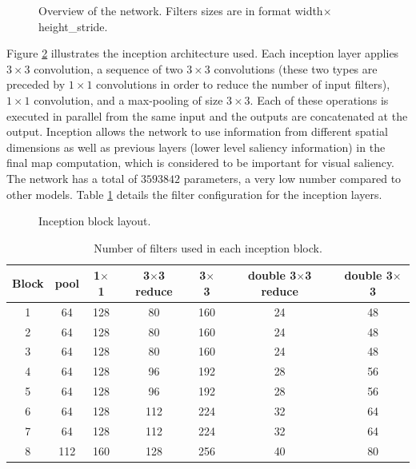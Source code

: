 \documentclass[10pt,twocolumn,letterpaper]{article}
\begin{document}
\begin{figure}
\begin{center}
\def\svgwidth{1.5\columnwidth}

\label{fig:model}
    \caption{Overview of the network.
        Filters sizes are in format width$\times$height\_stride.}
\end{center}
\end{figure}

Figure \ref{fig:newinception} illustrates the inception
architecture used.
Each inception layer applies
$3 \times 3$ convolution, a sequence of two $3 \times 3$ convolutions
(these two types are preceded by $1\times 1$ convolutions in order to
reduce the number of input filters), $1 \times 1$ convolution,
and a max-pooling of size $3 \times 3$.
Each of these operations is executed in parallel from the same input
and the outputs are concatenated at the output.
Inception allows the network to use
information from different spatial dimensions as well as previous
layers (lower level saliency information) in the final map
computation, which is considered to be important for visual saliency.
The network has a total of $3593842$ parameters, a very low number
compared to other models.
Table \ref{table:inception} details the filter configuration for the
inception layers.

\begin{figure}[!htb]
    \centering
    \def\svgwidth{\linewidth}
    
    \caption{Inception block layout.}
   \label{fig:newinception}
\end{figure}

\begin{table}
\begin{center}
\small
\label{table:inception}
\caption{Number of filters used in each inception block.}
\begin{tabular}{|c|c|c|c|c|c|c|}
	\hline
    Block & pool & 1$\times$1 & 3$\times$3 reduce &
    3$\times$3 & double 3$\times$3 reduce & double 3$\times$3\\
    \hline
    1 & 64 & 128 & 80 & 160 & 24 & 48\\
    \hline
    2 & 64 & 128 & 80 & 160 & 24 & 48\\
    \hline
    3 & 64 & 128 & 80 & 160 & 24 & 48\\
    \hline
    4 & 64 & 128 & 96 & 192 & 28 & 56\\
    \hline
    5 & 64 & 128 & 96 & 192 & 28 & 56\\
    \hline
    6 & 64 & 128 & 112 & 224 & 32 & 64\\
    \hline
    7 & 64 & 128 & 112 & 224 & 32 & 64\\
    \hline
    8 & 112 & 160 & 128 & 256 & 40 & 80\\
    \hline
\end{tabular}
\end{center}
\end{table}
\end{document}
